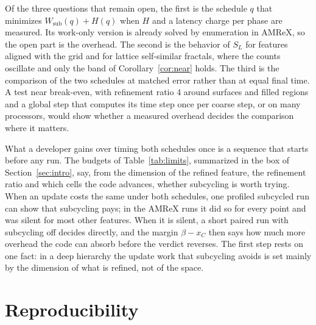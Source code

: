 \documentclass[12pt]{article}
\theoremstyle{remark}
\newcommand{\WL}{W_{\mathrm{sub}}}
\begin{document}
Of the three questions that remain open, the first is the schedule $q$ that minimizes $\WL(q)+H(q)$ when $H$ and a latency charge per phase are measured. Its work-only version is already solved by enumeration in AMReX, so the open part is the overhead. The second is the behavior of $S_L$ for features aligned with the grid and for lattice self-similar fractals, where the counts oscillate and only the band of Corollary~\ref{cor:near} holds. The third is the comparison of the two schedules at matched error rather than at equal final time. A test near break-even, with refinement ratio 4 around surfaces and filled regions and a global step that computes its time step once per coarse step, or on many processors, would show whether a measured overhead decides the comparison where it matters.

What a developer gains over timing both schedules once is a sequence that starts before any run. The budgets of Table~\ref{tab:limits}, summarized in the box of Section~\ref{sec:intro}, say, from the dimension of the refined feature, the refinement ratio and which cells the code advances, whether subcycling is worth trying. When an update costs the same under both schedules, one profiled subcycled run can show that subcycling pays; in the AMReX runs it did so for every point and was silent for most other features. When it is silent, a short paired run with subcycling off decides directly, and the margin $\beta-x_C$ then says how much more overhead the code can absorb before the verdict reverses. The first step rests on one fact: in a deep hierarchy the update work that subcycling avoids is set mainly by the dimension of what is refined, not of the space.


\section*{Reproducibility}
\end{document}
